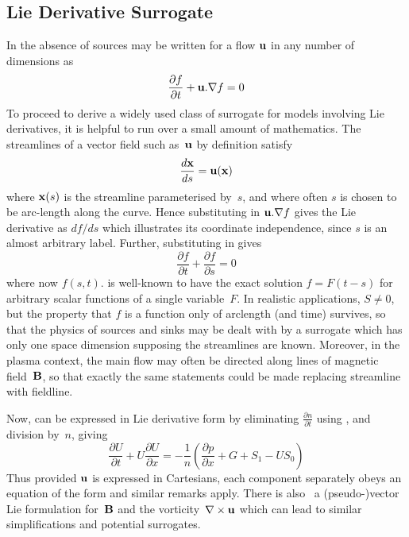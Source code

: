 \subsection{Lie Derivative Surrogate}\label{sec:lied}

In the absence of sources  may be written for a flow
${\bf u}$ in any number of dimensions as
\begin{equation}\label{eq:lief}
\frac{\partial f}{\partial t} + {\bf u}.\nabla f =0
\end{equation}
To proceed to derive a widely used class of surrogate for models involving
Lie derivatives,  it is helpful to run over a small amount of mathematics.
The streamlines of a vector field such as~${\bf u}$ by definition satisfy
\begin{equation}\label{eq:strml}
\frac{d {\bf x}}{ds}={\bf u }({\bf x})
\end{equation}
where ${\bf x}(s)$ is the streamline parameterised by~$s$, and where often
$s$ is chosen to be arc-length along the curve.
Hence substituting  in ${\bf u}.\nabla f$ gives the Lie derivative
as $d f/d s$ which illustrates its
coordinate independence, since $s$ is an almost arbitrary label.
Further,  substituting  in  gives
\begin{equation}\label{eq:scal1}
\frac{\partial f}{\partial t} +  \frac{\partial f}{\partial s} =0
\end{equation}
where now $f(s,t)$.  is well-known to have the exact solution
$f=F(t-s)$ for arbitrary scalar functions of a single variable~$F$.
In realistic applications, $S\neq0$, but  the property that $f$ is a function only of arclength
(and time) survives, so that the physics of sources and sinks may be dealt with by a surrogate
which has only one space dimension supposing the streamlines are known.
Moreover, in the plasma context, the main flow may often be directed along
lines of magnetic field~${\bf B}$, so that exactly the same statements could be made 
replacing streamline with fieldline.

Now,  can be expressed in Lie derivative form by eliminating 
$\frac{\partial n}{\partial t}$ using , and division by~$n$, giving
\begin{equation}\label{eq:liemom}
 \frac{\partial U}{\partial t}  +  U \frac{\partial  U}{\partial x} = -\frac{1}{n} \left(  \frac{\partial p}{\partial x} + G + S_1 - U S_0 \right)
\end{equation}
Thus provided ${\bf u}$ is expressed in Cartesians, each component separately obeys an
equation of the form  and similar remarks apply. There is also~\cite{Wa13a}  a (pseudo-)vector
Lie formulation for~${\bf B}$ and the vorticity~${\bf \nabla}\times{\bf u}$ which can lead to
similar simplifications and potential surrogates.


